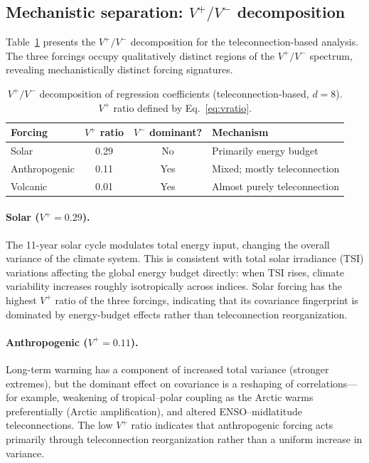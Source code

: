 \documentclass[preprint,12pt]{elsarticle}
\begin{document}
\subsection{Mechanistic separation: $V^+/V^-$ decomposition}\label{sec:mechanism}

Table~\ref{tab:vpvm} presents the $V^+/V^-$ decomposition for the teleconnection-based analysis.
The three forcings occupy qualitatively distinct regions of the $V^+/V^-$ spectrum, revealing mechanistically distinct forcing signatures.

\begin{table}[t]
\centering
\caption{$V^+/V^-$ decomposition of regression coefficients (teleconnection-based, $d=8$). $V^+$ ratio defined by Eq.~\eqref{eq:vratio}.}
\label{tab:vpvm}
\begin{tabular}{lccl}
\toprule
Forcing & $V^+$ ratio & $V^-$ dominant? & Mechanism \\
\midrule
Solar & 0.29 & No & Primarily energy budget \\
Anthropogenic & 0.11 & Yes & Mixed; mostly teleconnection \\
Volcanic & 0.01 & Yes & Almost purely teleconnection \\
\bottomrule
\end{tabular}
\end{table}

\paragraph{Solar ($V^+ = 0.29$).}
The 11-year solar cycle modulates total energy input, changing the overall variance of the climate system.
This is consistent with total solar irradiance (TSI) variations affecting the global energy budget directly: when TSI rises, climate variability increases roughly isotropically across indices.
Solar forcing has the highest $V^+$ ratio of the three forcings, indicating that its covariance fingerprint is dominated by energy-budget effects rather than teleconnection reorganization.

\paragraph{Anthropogenic ($V^+ = 0.11$).}
Long-term warming has a component of increased total variance (stronger extremes), but the dominant effect on covariance is a reshaping of correlations---for example, weakening of tropical--polar coupling as the Arctic warms preferentially (Arctic amplification), and altered ENSO--midlatitude teleconnections.
The low $V^+$ ratio indicates that anthropogenic forcing acts primarily through teleconnection reorganization rather than a uniform increase in variance.
\end{document}
